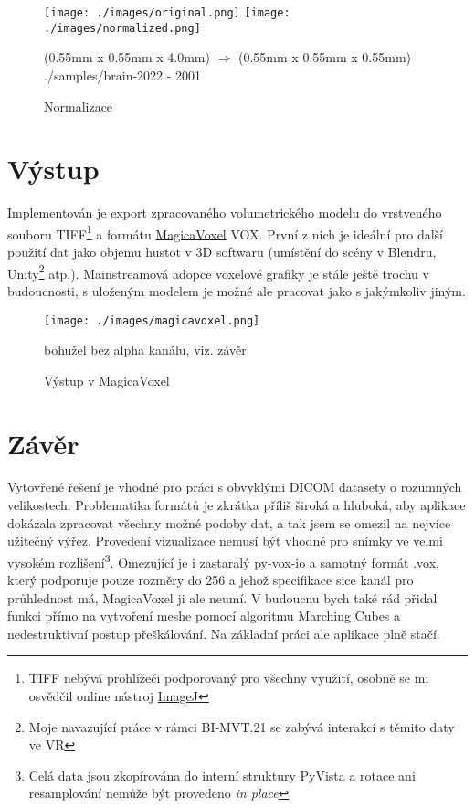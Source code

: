 \documentclass[czech]{pyt-report}
\begin{document}
\begin{figure}[h]
  \centering\leavevmode
  \texttt{[image: ./images/original.png]}
  \texttt{[image: ./images/normalized.png]}\vskip-0.5cm
  \smallskip
  \caption{Normalizace}
  \smallskip
  \tiny (0.55mm x 0.55mm x 4.0mm) $\Rightarrow$ (0.55mm x 0.55mm x 0.55mm)
  \tiny ./samples/brain-2022 - 2001
  \label{fig:normalization}
\end{figure}

\section{Výstup}
\label{sec:vystup}
Implementován je export zpracovaného volumetrického modelu do vrstveného souboru TIFF\footnote{TIFF nebývá prohlížeči podporovaný pro všechny využití, osobně se mi osvědčil online nástroj \href{https://ij.imjoy.io/}{ImageJ}} a formátu \href{https://ephtracy.github.io/}{MagicaVoxel} VOX\cite{bib:magicavoxel-vox}. První z nich je ideální pro další použití dat jako objemu hustot v 3D softwaru (umístění do scény v Blendru, Unity\footnote{Moje navazující práce v rámci BI-MVT.21 se zabývá interakcí s těmito daty ve VR} atp.). Mainstreamová adopce voxelové grafiky je stále ještě trochu v budoucnosti, s uloženým modelem je možné ale pracovat jako s jakýmkoliv jiným.

\begin{figure}[h]
  \centering\leavevmode
  \texttt{[image: ./images/magicavoxel.png]}\vskip-0.5cm
  \medskip
  \caption{Výstup v MagicaVoxel}
  \smallskip
  \tiny bohužel bez alpha kanálu, viz. \hyperref[sec:zaver]{závěr}
  \label{fig:magicavoxel}
\end{figure}

\section{Závěr}
\label{sec:zaver}
Vytovřené řešení je vhodné pro práci s obvyklými DICOM datasety o rozumných velikostech. Problematika formátů je zkrátka příliš široká a hluboká, aby aplikace dokázala zpracovat všechny možné podoby dat, a tak jsem se omezil na nejvíce užitečný výřez. Provedení vizualizace nemusí být vhodné pro snímky ve velmi vysokém rozlišení\footnote{Celá data jsou zkopírována do interní struktury PyVista a rotace ani resamplování nemůže být provedeno \emph{in place}}. Omezující je i zastaralý \href{https://github.com/gromgull/py-vox-io}{py-vox-io} a samotný formát .vox\cite{bib:magicavoxel-vox}, který podporuje pouze rozměry do 256 a jehož specifikace sice kanál pro průhlednost má, MagicaVoxel ji ale neumí. V budoucnu bych také rád přidal funkci přímo na vytvoření meshe pomocí algoritmu Marching Cubes\cite{bib:marchingcubes} a nedestruktivní postup přeškálování. Na základní práci ale aplikace plně stačí.
\end{document}
